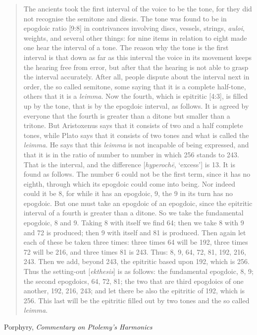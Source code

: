 \documentclass{amsart}
\theoremstyle{definition}
\begin{document}
\begin{quote}
The ancients took the first interval of the voice to be the tone, for they did
not recognise the semitone and diesis. The tone was found to be in epogdoic
ratio [9:8] in contrivances involving discs, vessels, strings, {\em auloi}, weights, and
several other things: for nine items in relation to eight made one hear the
interval of a tone. The reason why the tone is the first interval is that down as
far as this interval the voice in its movement keeps the hearing free from error,
but after that the hearing is not able to grasp the interval accurately. After all,
people dispute about the interval next in order, the so called semitone, some
saying that it is a complete half-tone, others that it is a {\em leimma}. Now the fourth,
which is epitritic [4:3], is filled up by the tone, that is by the epogdoic interval,
as follows. It is agreed by everyone that the fourth is greater than a ditone but
smaller than a tritone. But Aristoxenus says that it consists of two and a half
complete tones, while Plato says that it consists of two tones and what is called
the {\em leimma}. He says that this {\em leimma} is not incapable of being expressed, and
that it is in the ratio of number to number in which 256 stands to 243. That is
the interval, and the difference [{\em hyperoch\={e}}, `excess'] is 13. It is found as
follows. The number 6 could not be the first term, since it has no eighth,
through which its epogdoic could come into being. Nor indeed could it be 8, for
while it has an epogdoic, 9, the 9 in its turn has no epogdoic. But one must take
an epogdoic of an epogdoic, since the epitritic interval of a fourth is greater
than a ditone. So we take the fundamental epogdoic, 8 and 9. Taking 8 with
itself we find 64; then we take 8 with 9 and 72 is produced; then 9 with itself
and 81 is produced. Then again let each of these be taken three times: three
times 64 will be 192, three times 72 will be 216, and three times 81 is 243. Thus:
8, 9, 64, 72, 81, 192, 216, 243. Then we add, beyond 243, the epitritic based
upon 192, which is 256. Thus the setting-out [{\em ekthesis}] is as follows: the
fundamental epogdoic, 8, 9; the second epogdoics, 64, 72, 81; the two that are
third epogdoics of one another, 192, 216, 243; and let there be also the epitritic
of 192, which is 256. This last will be the epitritic filled out by two tones and
the so called {\em leimma}.
\end{quote}

Porphyry, {\em Commentary on Ptolemy's Harmonics} \cite{porphyry}
\end{document}
